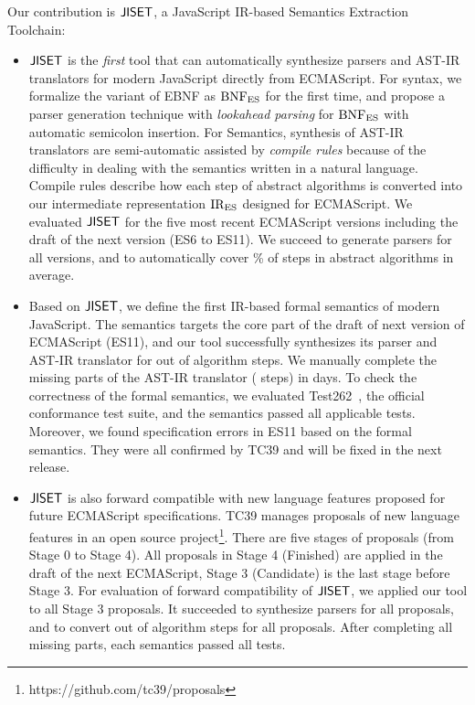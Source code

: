 Our contribution is \( \text{\sf JISET} \), a JavaScript IR-based Semantics Extraction
Toolchain:
\begin{itemize}[leftmargin=0.5cm]
  \item \( \text{\sf JISET} \) is the \textit{first} tool that can automatically synthesize
    parsers and AST-IR translators for modern JavaScript directly from
    ECMAScript.  For syntax, we formalize the variant of EBNF as \( \text{BNF}_{\text{ES}} \)
    for the first time, and propose a parser generation technique with
    \textit{lookahead parsing} for \( \text{BNF}_{\text{ES}} \) with automatic semicolon
    insertion. For Semantics, synthesis of AST-IR translators are semi-automatic
    assisted by \textit{compile rules} because of the difficulty in dealing with
    the semantics written in a natural language.  Compile rules describe how
    each step of abstract algorithms is converted into our intermediate
    representation \( \text{IR}_\text{ES} \) designed for ECMAScript. We evaluated \( \text{\sf JISET} \)
    for the five most recent ECMAScript versions including the draft of the next
    version (ES6 to ES11).  We succeed to generate parsers for all versions, and
    to automatically cover \% of steps in abstract algorithms in
    average.
  \item Based on \( \text{\sf JISET} \), we define the first IR-based formal semantics of
    modern JavaScript.  The semantics targets the core part of the draft of next
    version of ECMAScript (ES11), and our tool successfully synthesizes its
    parser and AST-IR translator for  out of 
    algorithm steps.  We manually complete the missing parts of the AST-IR
    translator ( steps) in  days.  To check the correctness
    of the formal semantics, we evaluated Test262~\cite{test262}, the official
    conformance test suite, and the semantics passed all 
    applicable tests.  Moreover, we found  specification errors in ES11
    based on the formal semantics.  They were all confirmed by TC39 and will be
    fixed in the next release.
  \item \( \text{\sf JISET} \) is also forward compatible with new language features
    proposed for future ECMAScript specifications.  TC39 manages proposals of
    new language features in an open source
    project\footnote{https://github.com/tc39/proposals}.  There are five stages
    of proposals (from Stage 0 to Stage 4).  All proposals in Stage 4 (Finished)
    are applied in the draft of the next ECMAScript, Stage 3 (Candidate) is the
    last stage before Stage 3.  For evaluation of forward compatibility of \(
    \text{\sf JISET} \), we applied our tool to all  Stage 3 proposals. It
    succeeded to synthesize parsers for all proposals, and to convert 
    out of  algorithm steps for all proposals. After completing all
    missing parts, each semantics passed all  tests.
\end{itemize}

